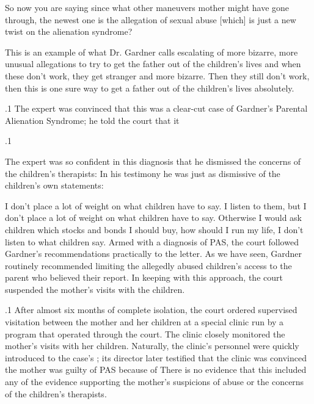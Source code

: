 \documentclass[11pt, twoside]{article}
\begin{document}
{{\begin{docDescription}
So now you are saying since what
other maneuvers mother might have gone through, the
newest one is the allegation of sexual abuse [which] is
just a new twist on the alienation syndrome?

This is an example of what Dr.\@
Gardner calls escalating of more bizarre, more unusual
allegations to try to get the father out of the children’s
lives and when these don’t work, they get stranger and
more bizarre. Then they still don’t work, then this is
one sure way to get a father out of the children’s lives
absolutely.

\end{docDescription}

}%

\p.1{%
The expert was convinced that this was a clear-cut case of Gardner’s
Parental Alienation Syndrome; he told
the court that it 
}%

\p.1{%
The expert was so confident in this diagnosis that he dismissed the
concerns of the children’s therapists:  In his testimony he was just as dismissive of the
children’s own statements:

\begin{blockQuote}
I don’t place a lot of weight on what children have to say. I listen to
them, but I don’t place a lot of weight on what children have to say.
Otherwise I would ask children which stocks and bonds I should
buy, how should I run my life, I don’t listen to what children say.
Armed with a diagnosis of PAS, the court followed Gardner’s recommendations practically to the letter. As we have seen, Gardner routinely
recommended limiting the allegedly abused children’s access to the parent who believed their report. In keeping with this approach, the court
suspended the mother’s visits with the children.
\end{blockQuote}

}%

\p.1{%
After almost six months of complete isolation, the court ordered
supervised visitation between the mother and her children at a special clinic run by a program that operated through the court. The
clinic closely monitored the mother’s visits with her children. Naturally,
the clinic’s personnel were quickly introduced to the case’s ; its director later testified that the clinic was convinced the
mother was guilty of PAS because of  There is no evidence that this  included any of the
evidence supporting the mother’s suspicions of abuse or the concerns of
the children’s therapists.
}%

}
\end{document}
